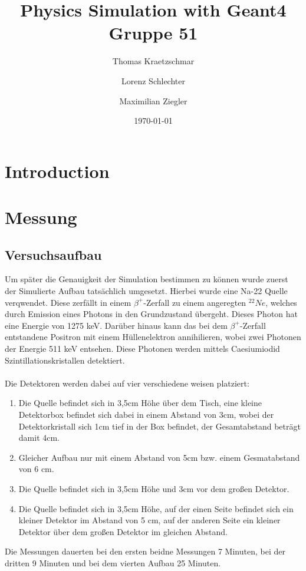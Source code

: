 \documentclass[a4paper,11pt,twoside]{article}
\title{%
{\Huge Physics Simulation with Geant4}\\[0.5\baselineskip]
{\normalsize Gruppe 51}
}
\author{%
Thomas Kraetzschmar
\and Lorenz Schlechter
\and Maximilian Ziegler
}
\date{\today}
\begin{document}
\pagestyle{fancy}
\maketitle
\clearpage
\tableofcontents
\clearpage
\pagestyle{fancy}
\section{Introduction}

\section{Messung}
\subsection{Versuchsaufbau}
Um später die Genauigkeit der Simulation bestimmen zu können wurde zuerst der Simulierte Aufbau tatsächlich umgesetzt. Hierbei wurde eine Na-22 Quelle verqwendet. Diese zerfällt in einem $\beta^+$-Zerfall zu einem angeregten $^{22}Ne$, welches durch Emission eines Photons in den Grundzustand übergeht. Dieses Photon hat eine Energie von 1275 keV. Darüber hinaus kann das bei dem $\beta^+$-Zerfall entstandene Positron mit einem Hüllenelektron annihilieren, wobei zwei Photonen der Energie 511 keV entsehen.
Diese Photonen werden mittels Caesiumiodid Szintillationskristallen detektiert. \\\\Die Detektoren werden dabei auf vier verschiedene weisen platziert:
\begin{enumerate}
\item Die Quelle befindet sich in 3,5cm Höhe über dem Tisch, eine kleine Detektorbox befindet sich dabei in einem Abstand von 3cm, wobei der Detektorkristall sich 1cm tief in der Box befindet, der Gesamtabstand beträgt damit 4cm.
\item Gleicher Aufbau nur mit einem Abstand von 5cm bzw. einem Gesmatabstand von 6 cm.
\item Die Quelle befindet sich in 3,5cm Höhe und 3cm vor dem großen Detektor.
\item Die Quelle befindet sich in 3,5cm Höhe, auf der einen Seite befindet sich ein kleiner Detektor im Abstand von 5 cm, auf der anderen Seite ein kleiner Detektor über dem großen Detektor im gleichen Abstand.
\end{enumerate}
Die Messungen dauerten bei den ersten beidne Messungen 7 Minuten, bei der dritten 9 Minuten und bei dem vierten Aufbau 25 Minuten.
\end{document}
